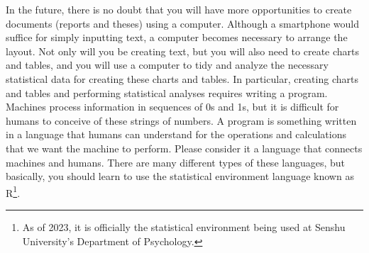 \documentclass{ltjsbook}
\begin{document}
In the future, there is no doubt that you will have more opportunities to create documents (reports and theses) using a computer. Although a smartphone would suffice for simply inputting text, a computer becomes necessary to arrange the layout. Not only will you be creating text, but you will also need to create charts and tables, and you will use a computer to tidy and analyze the necessary statistical data for creating these charts and tables. In particular, creating charts and tables and performing statistical analyses requires writing a program. Machines process information in sequences of 0s and 1s, but it is difficult for humans to conceive of these strings of numbers. A program is something written in a language that humans can understand for the operations and calculations that we want the machine to perform. Please consider it a language that connects machines and humans. There are many different types of these languages, but basically, you should learn to use the statistical environment language known as R\footnote{As of 2023, it is officially the statistical environment being used at Senshu University's Department of Psychology.}.
\end{document}
